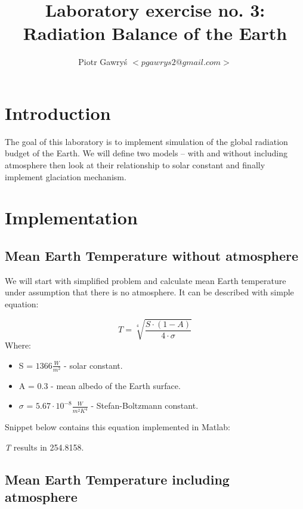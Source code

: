 \documentclass[12pt]{article}
\title{Laboratory exercise no. 3: Radiation Balance of the Earth}
\author{Piotr Gawry\'s $<pgawrys2@gmail.com>$}
\begin{document}
\maketitle

\section{Introduction}
The goal of this laboratory is to implement simulation of the global radiation budget of the Earth. We will define two models -- with and without including atmosphere then look at their relationship to solar constant and finally implement glaciation mechanism.

\section{Implementation}

\subsection{Mean Earth Temperature without atmosphere}

We will start with simplified problem and calculate mean Earth temperature under assumption that there is no atmosphere. It can be described with simple equation:

\begin{equation}
T = \sqrt[4]{\frac{S \cdot (1 - A)}{4 \cdot \sigma}}
\end{equation}
Where:
\begin{itemize}
	\item S = $1366 \frac{W}{m^2}$ - solar constant.
	\item A = $0.3$ - mean albedo of the Earth surface.
	\item $\sigma$ = $5.67 \cdot 10^{-8} \frac{W}{m^2K^4}$ - Stefan-Boltzmann constant.
\end{itemize}

Snippet below contains this equation implemented in Matlab:



\textit{T} results in 254.8158.

\subsection{Mean Earth Temperature including atmosphere}
\end{document}
